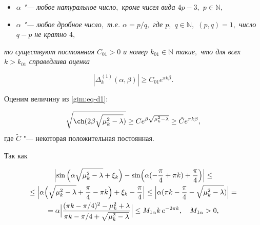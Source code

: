 \begin{itemize}

\item[1)] {\it $\alpha$ "--- любое натуральное число$,$ кроме чисел вида $4p-3,$ $p\in \mathbb{N},\;$} 

\item[2)] {\it $\alpha$ "--- любое дробное число$,$ т.е. $\alpha=p/q,$ где $p,$ $ q\in \mathbb{N},$ $(p,q)=1,$ число $q-p$ не кратно $4,$}

\end{itemize} 

{\it   то существуют постоянная $ C_{01}>0$ и номер $k_{01}\in \mathbb{N}$ такие$,$ что для всех $k>k_{01}$ справедлива оценка }

\begin{equation}

|\Delta_{k}^{(1)}(\alpha,\beta)|\ge C_{01} e^{\pi k\beta}.

\label{gim:eq-ocenka1}

\end{equation}



\smallskip



\proof Оценим величину из \eqref{gim:eq-d1}: 

$$

\sqrt{\ch(2\beta\sqrt{\mu_k^2-\lambda})}\ge C  e^{\beta\sqrt{\mu_k^2-\lambda}}\ge \tilde C e^{\pi k\beta},

$$ где $\tilde C$ "--- некоторая положительная постоянная.



Так как

\begin{multline*}

\Bigl|\sin\Big(\alpha\sqrt{\mu_k^2-\lambda}+\xi_k\Big)-\sin\Bigl(\alpha(-\frac\pi 4+\pi k)+\frac\pi 4\Bigr)\Bigr|\le \\

\le \Bigl|\alpha\Bigl(\sqrt{\mu_k^2-\lambda}+\frac\pi 4-\pi k\Bigr)+\xi_k-\frac\pi 4\Bigr|\le 

\Bigl|\alpha(\pi k-\frac\pi 4-\sqrt{\mu_k^2-\lambda})\Bigr|=

\\

=\alpha\Bigl|

\frac{(\pi k-\pi/4)^2-\mu_k^2+\lambda}{\pi k-\pi/4+\sqrt{\mu_k^2-\lambda}}\Bigr|\le M_{1\alpha}k\,e^{-2\pi k},\quad M_{1\alpha}>0,

\end{multline*}

